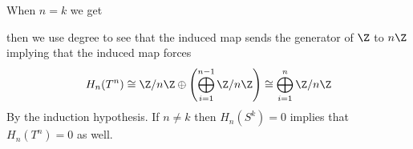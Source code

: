 \documentclass{article}
\begin{document}
\begin{solution}{\parindent}
\begin{enumerate}[(a)]
    \begin{center}
    \end{center}
    When $n = k$ we get
    \begin{center}
    \end{center}
    then we use degree to see that the induced map sends the generator
    of $\Z$ to $n\Z$ implying that the induced map forces
    \[
    H_n(T^n) \cong \Z/n\Z \oplus \left(\bigoplus_{i=1}^{n-1}
      \Z/n\Z\right) \cong \bigoplus_{i=1}^{n} \Z/n\Z
    \]
    By the induction hypothesis. If $n \neq k$ then $H_n(S^k) = 0$
    implies that $H_n(T^n) = 0$ as well.
  \end{enumerate}
\end{solution}
\end{document}
